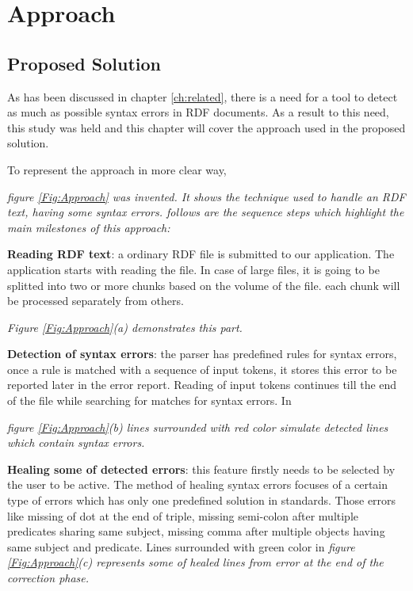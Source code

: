 \chapter{Approach}
\label{ch:approach}

\section{Proposed Solution}
As has been discussed in chapter \ref{ch:related}, there is a need for a tool to detect as much as possible syntax errors in RDF documents. As a result to this need, this study was held and this chapter will cover the approach used in the proposed solution.

	\vspace{5mm} %

 To represent the approach in more clear way, {\it figure \ref{Fig:Approach} was invented. It shows the technique used to handle an RDF text, having some syntax errors. follows are the sequence steps which highlight the main milestones of this approach:
 \begin{enumerate}[label=(\alph*)]
\item \textbf{Reading RDF text}: a ordinary RDF file is submitted to our application. The application starts with reading the file. In case of large files, it is going to be splitted into two or more chunks based on the volume of the file. each chunk will be processed separately from others.  {\it Figure \ref{Fig:Approach}(a) demonstrates this part. 
\item \textbf{Detection of syntax errors}: the parser has predefined rules for syntax errors, once a rule is matched with a sequence of input tokens, it stores this error to be reported later in the error report. Reading of input tokens continues till the end of the file while searching for matches for syntax errors. In  {\it figure \ref{Fig:Approach}(b) lines surrounded with red color simulate detected lines which contain syntax errors. 
\item \textbf {Healing some of detected errors}: this feature firstly needs to be selected by the user to be active. The method of healing syntax errors focuses of a certain type of errors which has only one predefined solution in standards. Those errors like missing of dot at the end of triple, missing semi-colon after multiple predicates sharing same subject, missing comma after multiple objects having same subject and predicate. Lines surrounded with green color in {\it figure \ref{Fig:Approach}(c) represents some of healed lines from error at the end of the correction phase.  
}}}
\end{enumerate}}
